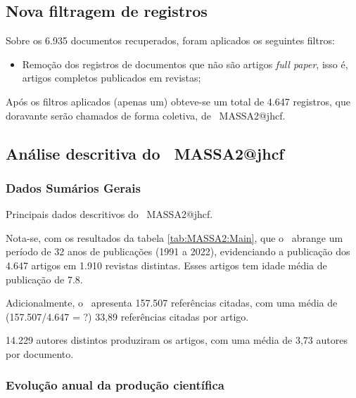 \subsection{Nova filtragem de registros}

Sobre os 6.935 documentos recuperados, foram  aplicados os seguintes filtros:
\begin{itemize}
    \item Remoção dos registros de documentos que não são artigos \textit{full paper}, isso é, artigos completos publicados em revistas;
\end{itemize}

Após os filtros aplicados (apenas um)  obteve-se um total de 4.647 registros, que doravante serão chamados de forma coletiva, de \dataset\   MASSA2@jhcf.

\subsection{Análise descritiva do \dataset\   MASSA2@jhcf}

\subsubsection{Dados Sumários Gerais}

\begin{table}[]
    \centering
{}
    \caption{Principais dados descritivos do \dataset\   MASSA2@jhcf.}
    \label{tab:MASSA2:Main}
\end{table}

Nota-se, com os resultados da tabela \ref{tab:MASSA2:Main}, que o \dataset\   abrange um período de 32 anos de publicações (1991 a 2022), evidenciando  a publicação dos 4.647 artigos em 1.910 revistas distintas. Esses artigos tem idade média de publicação de 7.8.

Adicionalmente, o \dataset\ apresenta 157.507 referências citadas, com uma média de (157.507/4.647 = ?) 33,89 referências citadas por artigo.

14.229 autores distintos produziram os artigos, com uma média de 3,73 autores por documento.

\subsubsection{Evolução anual da produção científica}

